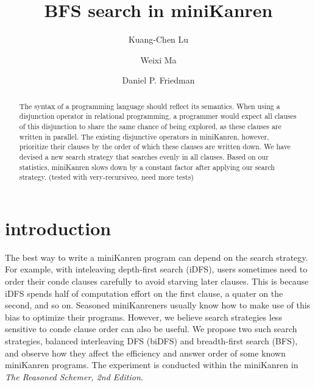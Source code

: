 \documentclass[format=acmlarge, review=true, authordraft=true]{acmart}
\title{BFS search in miniKanren}
\author{Kuang-Chen Lu}
\affiliation{Indiana University}
\author{Weixi Ma}
\affiliation{Indiana University}
\author{Daniel P. Friedman}
\affiliation{Indiana University}
\begin{document}
\begin{abstract}

The syntax of a programming language should reflect its semantics.
When using a disjunction operator in relational programming, a programmer would
expect all clauses of this disjunction to share the same chance of being explored,
as these clauses are written in parallel. The existing disjunctive operators in
miniKanren, however, prioritize their clauses by the order of which these clauses are
written down. We have devised a new search strategy that searches evenly in all
clauses. Based on our statistics, miniKanren slows down by a constant factor after
applying our search strategy.
(tested with very-recursiveo, need more tests)



\end{abstract}

\maketitle

\section{introduction}

The best way to write a miniKanren program can depend on the search strategy. For example, with inteleaving depth-first search (iDFS), users sometimes need to order their conde clauses carefully to avoid starving later clauses. This is because iDFS spends half of computation effort on the first clause, a quater on the second, and so on. Seasoned miniKanreners usually know how to make use of this bias to optimize their programs. However, we believe search strategies less sensitive to conde clause order can also be useful. We propose two such search strategies, balanced interleaving DFS (biDFS) and breadth-first search (BFS), and observe how they affect the efficiency and answer order of some known miniKanren programs. The experiment is conducted within the miniKanren in \textit{The Reasoned Schemer, 2nd Edition}.


\end{document}
